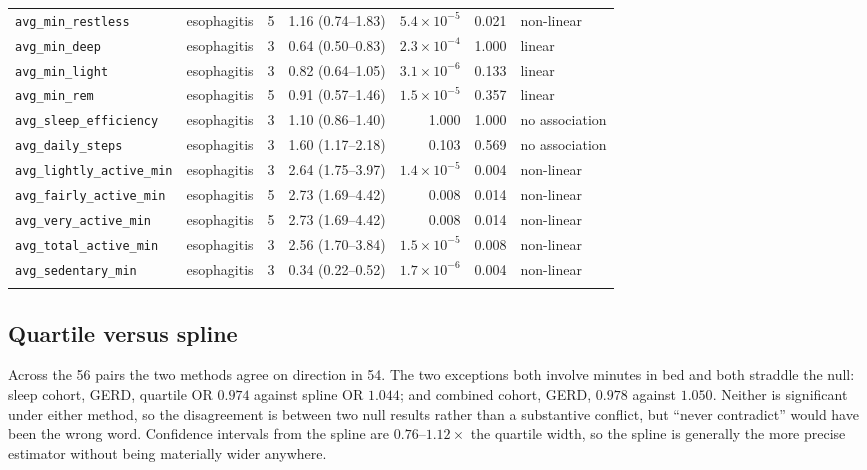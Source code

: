 \documentclass[11pt]{article}
\newcommand{\code}[1]{\texttt{\small #1}}
\begin{document}
\begin{longtable}{@{}p{3.3cm}p{1.7cm}c p{2.1cm} r r p{1.6cm}@{}}
\code{avg\_min\_restless} & esophagitis & 5 & 1.16 (0.74--1.83) & $5.4\times10^{-5}$ & 0.021 & non-linear \\
\code{avg\_min\_deep} & esophagitis & 3 & 0.64 (0.50--0.83) & $2.3\times10^{-4}$ & 1.000 & linear \\
\code{avg\_min\_light} & esophagitis & 3 & 0.82 (0.64--1.05) & $3.1\times10^{-6}$ & 0.133 & linear \\
\code{avg\_min\_rem} & esophagitis & 5 & 0.91 (0.57--1.46) & $1.5\times10^{-5}$ & 0.357 & linear \\
\code{avg\_sleep\_efficiency} & esophagitis & 3 & 1.10 (0.86--1.40) & 1.000 & 1.000 & no association \\
\code{avg\_daily\_steps} & esophagitis & 3 & 1.60 (1.17--2.18) & 0.103 & 0.569 & no association \\
\code{avg\_lightly\_active\_min} & esophagitis & 3 & 2.64 (1.75--3.97) & $1.4\times10^{-5}$ & 0.004 & non-linear \\
\code{avg\_fairly\_active\_min} & esophagitis & 5 & 2.73 (1.69--4.42) & 0.008 & 0.014 & non-linear \\
\code{avg\_very\_active\_min} & esophagitis & 5 & 2.73 (1.69--4.42) & 0.008 & 0.014 & non-linear \\
\code{avg\_total\_active\_min} & esophagitis & 3 & 2.56 (1.70--3.84) & $1.5\times10^{-5}$ & 0.008 & non-linear \\
\code{avg\_sedentary\_min} & esophagitis & 3 & 0.34 (0.22--0.52) & $1.7\times10^{-6}$ & 0.004 & non-linear \\
\addlinespace
\bottomrule \end{longtable}\normalsize

\subsection{Quartile versus spline}
\label{sec:res-qvs}
Across the 56 pairs the two methods agree on direction in 54. The two exceptions both involve
minutes in bed and both straddle the null: sleep cohort, GERD, quartile OR $0.974$ against spline
OR $1.044$; and combined cohort, GERD, $0.978$ against $1.050$. Neither is significant under either
method, so the disagreement is between two null results rather than a substantive conflict, but
``never contradict'' would have been the wrong word. Confidence intervals from the spline are
$0.76$--$1.12\times$ the quartile width, so the spline is generally the more precise estimator
without being materially wider anywhere.
\end{document}
